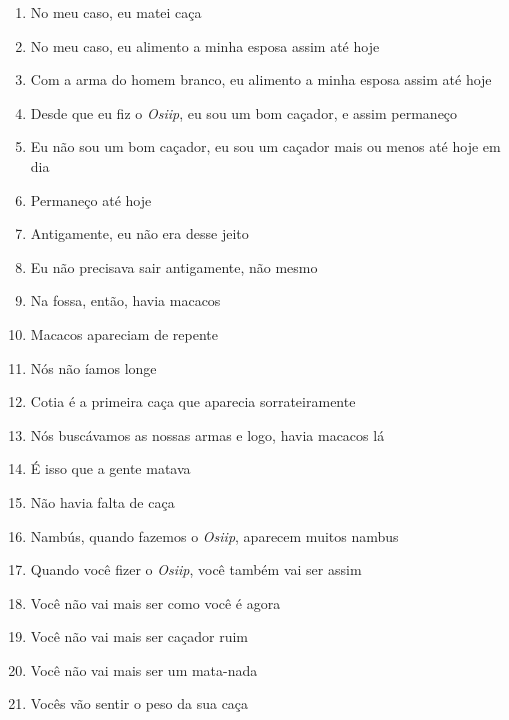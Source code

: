 \begin{enumerate}
 \begin{center}\end{center}
 
 \item No meu caso, eu matei caça
 \item No meu caso, eu alimento a minha esposa assim até hoje
 \item Com a arma do homem branco, eu alimento a minha esposa assim até hoje
 \item Desde que eu fiz o \textit{Osiip}, eu sou um bom caçador, e assim permaneço
 
 \begin{center}\end{center}
 
 \item Eu não sou um bom caçador, eu sou um caçador mais ou menos até hoje em dia
 \item Permaneço até hoje
 \item Antigamente, eu não era desse jeito
 \item Eu não precisava sair antigamente, não mesmo
 
 \begin{center}\end{center}
 
 \item Na fossa, então, havia macacos
 \item Macacos apareciam de repente
 \item Nós não íamos longe
 \item Cotia é a primeira caça que aparecia sorrateiramente
 \item Nós buscávamos as nossas armas e logo, havia macacos lá
 \item É isso que a gente matava
 \item Não havia falta de caça
 \item Nambús, quando fazemos o \textit{Osiip}, aparecem muitos nambus
 
 \begin{center}\end{center}
 
 \item Quando você fizer o \textit{Osiip}, você também vai ser assim
 \item Você não vai mais ser como você é agora
 \item Você não vai mais ser caçador ruim
 \item Você não vai mais ser um mata-nada
 \item Vocês vão sentir o peso da sua caça
 

\end{enumerate}
